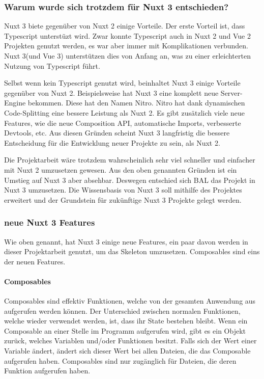 \subsubsection{Warum wurde sich trotzdem für Nuxt 3 entschieden?}
\label{sec:Warum wurde sich trotzdem für Nuxt 3 entschieden?}

Nuxt 3 biete gegenüber von Nuxt 2 einige Vorteile. Der erste Vorteil ist, dass Typescript unterstüzt wird. Zwar konnte Typescript auch in Nuxt 2 und Vue 2 Projekten genutzt werden, es war aber immer mit Komplikationen verbunden. Nuxt 3(und Vue 3) unterstützen dies von Anfang an, was zu einer erleichterten Nutzung von Typescript führt. 

Selbst wenn kein Typescript genutzt wird, beinhaltet Nuxt 3 einige Vorteile gegenüber von Nuxt 2. Beispielsweise hat Nuxt 3 eine komplett neue Server-Engine bekommen. Diese hat den Namen Nitro. Nitro hat dank dynamischen Code-Splitting eine bessere Leistung als Nuxt 2. Es gibt zusätzlich viele neue Features, wie die neue Composition API, automatische Imports, verbesserte Devtools, etc. Aus diesen Gründen scheint Nuxt 3 langfristig die bessere Entscheidung für die Entwicklung neuer Projekte zu sein, als Nuxt 2. 

Die Projektarbeit wäre trotzdem wahrscheinlich sehr viel schneller und einfacher mit Nuxt 2 umzusetzen gewesen. Aus den oben genannten Gründen ist ein Umstieg auf Nuxt 3 aber absehbar. Deswegen entschied sich \acs{BAL} das Projekt in Nuxt 3 umzusetzen. Die Wissensbasis von Nuxt 3 soll mithilfe des Projektes erweitert und der Grundstein für zukünftige Nuxt 3 Projekte gelegt werden.

\subsubsection{neue Nuxt 3 Features}
\label{sec:neue Nuxt 3 Features}

Wie oben genannt, hat Nuxt 3 einige neue Features, ein paar davon werden in dieser Projektarbeit genutzt, um das Skeleton umzusetzen. Composables sind eins der neuen Features.

\paragraph{Composables}

Composables sind effektiv Funktionen, welche von der gesamten Anwendung aus aufgerufen werden können. Der Unterschied zwischen normalen Funktionen, welche wieder verwendet werden, ist, dass ihr State bestehen bleibt. Wenn ein Composable an einer Stelle im Programm aufgerufen wird, gibt es ein Objekt zurück, welches Variablen und/oder Funktionen besitzt. Falls sich der Wert einer Variable ändert, ändert sich dieser Wert bei allen Dateien, die das Composable aufgerufen haben. Composables sind nur zugänglich für Dateien, die deren Funktion aufgerufen haben. 

